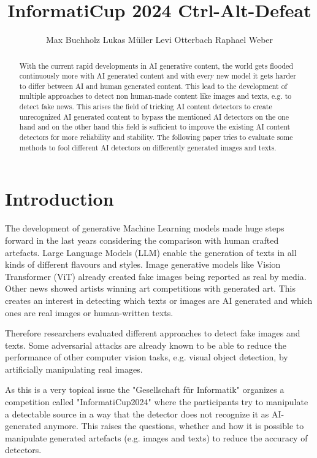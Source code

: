 \documentclass{article} %
\title{InformatiCup 2024 Ctrl-Alt-Defeat}
\author{Max Buchholz \And Lukas Müller \And Levi Otterbach \And Raphael Weber}
\begin{document}
\maketitle

\begin{abstract}
With the current rapid developments in AI generative content, the world gets flooded continuously more with AI generated content and with every new model it gets harder to differ between AI and human generated content. This lead to the development of multiple approaches to detect non human-made content like images and texts, e.g. to detect fake news. This arises the field of tricking AI content detectors to create unrecognized AI generated content to bypass the mentioned AI detectors on the one hand and on the other hand this field is sufficient to improve the existing AI content detectors for more reliability and stability. The following paper tries to evaluate some methods to fool different AI detectors on differently generated images and texts.
\end{abstract}

\section{Introduction}
The development of generative Machine Learning models made huge steps forward in the last years considering the comparison with human crafted artefacts. Large Language Models (LLM) enable the generation of texts in all kinds of different flavours and styles. Image generative models like Vision Transformer (ViT) already created fake images being reported as real by media. Other news showed artists winning art competitions with generated art. This creates an interest in detecting which texts or images are AI generated and which ones are real images or human-written texts.

Therefore researchers evaluated different approaches to detect fake images and texts. Some adversarial attacks are already known to be able to reduce the performance of other computer vision tasks, e.g. visual object detection, by artificially manipulating real images.

As this is a very topical issue the "Gesellschaft für Informatik" \cite{GI} organizes a competition called "InformatiCup2024" \cite{InformatiCup} where the participants try to manipulate a detectable source in a way that the detector does not recognize it as AI-generated anymore. This raises the questions, whether and how it is possible to manipulate generated artefacts (e.g. images and texts) to reduce the accuracy of detectors.
\end{document}
